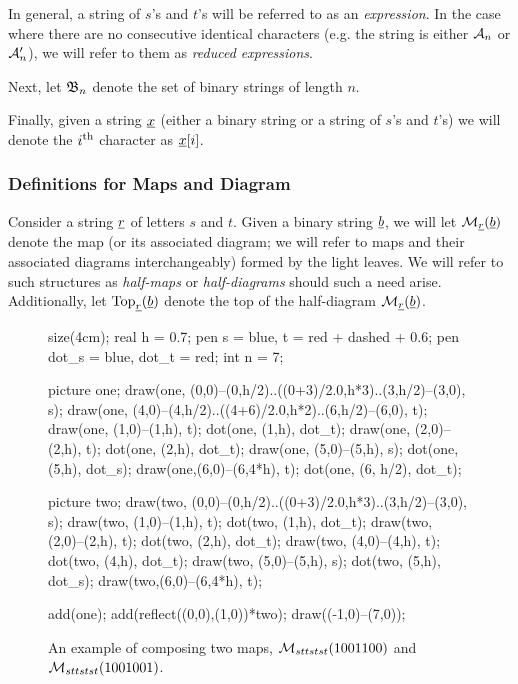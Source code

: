 In general, a string of $s$'s and $t$'s will be referred to as an \emph{expression}.  In the case where there are no consecutive identical characters (e.g. the string is either $\AA_n$ or $\AA_n'$), we will refer to them as \emph{reduced expressions}.

Next, let $\BB_n$ denote the set of binary strings of length $n$.

Finally, given a string $\ul x$ (either a binary string or a string of $s$'s and $t$'s) we will denote the $i\th$ character as $\ul x[i]$.

\subsubsection{Definitions for Maps and Diagram}
Consider a string $\ul r$ of letters $s$ and $t$.  Given a binary string $\ul b$, we will let $\MM_{\ul r}(\ul b)$ denote the map (or its associated diagram; we will refer to maps and their associated diagrams interchangeably) formed by the light leaves.  We will refer to such structures as \emph{half-maps} or \emph{half-diagrams} should such a need arise.  Additionally, let $\Top_{\ul r}(\ul b)$ denote the top of the half-diagram $\MM_{\ul r}(\ul b)$.

\begin{figure}[ht]
	\centering
	\begin{asy}
	size(4cm);
	real h = 0.7;
	pen s = blue, t = red + dashed + 0.6;
	pen dot_s = blue, dot_t = red;
	int n = 7;

	picture one;
	draw(one, (0,0)--(0,h/2)..((0+3)/2.0,h*3)..(3,h/2)--(3,0), s);
	draw(one, (4,0)--(4,h/2)..((4+6)/2.0,h*2)..(6,h/2)--(6,0), t);
	draw(one, (1,0)--(1,h), t);
	dot(one, (1,h), dot_t);
	draw(one, (2,0)--(2,h), t);
	dot(one, (2,h), dot_t);
	draw(one, (5,0)--(5,h), s);
	dot(one, (5,h), dot_s);
	draw(one,(6,0)--(6,4*h), t);
	dot(one, (6, h/2), dot_t);

	picture two;
	draw(two, (0,0)--(0,h/2)..((0+3)/2.0,h*3)..(3,h/2)--(3,0), s);
	draw(two, (1,0)--(1,h), t);
	dot(two, (1,h), dot_t);
	draw(two, (2,0)--(2,h), t);
	dot(two, (2,h), dot_t);
	draw(two, (4,0)--(4,h), t);
	dot(two, (4,h), dot_t);
	draw(two, (5,0)--(5,h), s);
	dot(two, (5,h), dot_s);
	draw(two,(6,0)--(6,4*h), t);

	add(one); add(reflect((0,0),(1,0))*two);
	draw((-1,0)--(7,0));
	\end{asy}
	\caption{An example of composing two maps, $\MM_{sttstst}(1001100)$ and $\MM_{sttstst}(1001001)$.}
	\label{fig:example_compose}
\end{figure}

